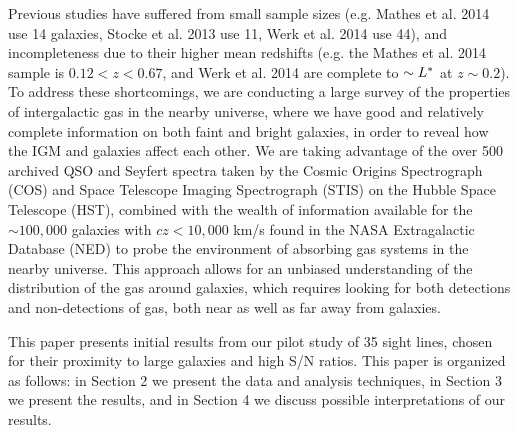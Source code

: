 \documentclass[iop]{emulateapj-rtx4}
\begin{document}
Previous studies have suffered from small sample sizes (e.g. Mathes et al. 2014 use 14 galaxies, Stocke et al. 2013 use 11, Werk et al. 2014 use 44), and incompleteness due to their higher mean redshifts (e.g. the Mathes et al. 2014 sample is $0.12 <z<0.67$, and Werk et al. 2014 are complete to $\sim L^{\**}$ at $z\sim0.2$). To address these shortcomings, we are conducting a large survey of the properties of intergalactic gas in the nearby universe, where we have good and relatively complete information on both faint and bright galaxies, in order to reveal how the IGM and galaxies affect each other. We are taking advantage of the over 500 archived QSO and Seyfert spectra taken by the Cosmic Origins Spectrograph (COS) and Space Telescope Imaging Spectrograph (STIS) on the Hubble Space Telescope (HST), combined with the wealth of information available for the $\sim100,000$ galaxies with $cz<10,000$ km/s found in the NASA Extragalactic Database (NED) to probe the environment of absorbing gas systems in the nearby universe. This approach allows for an unbiased understanding of the distribution of the gas around galaxies, which requires looking for both detections and non-detections of gas, both near as well as far away from galaxies.

This paper presents initial results from our pilot study of 35 sight lines, chosen for their proximity to large galaxies and high S/N ratios. This paper is organized as follows: in Section 2 we present the data and analysis techniques, in Section 3 we present the results, and in Section 4 we discuss possible interpretations of our results.


\end{document}
